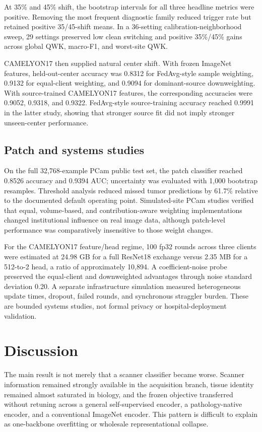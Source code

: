 \documentclass[10pt]{article}
\begin{document}
At 35\% and 45\% shift, the bootstrap intervals for all three headline metrics were positive. Removing the most frequent diagnostic family reduced trigger rate but retained positive 35/45-shift means. In a 36-setting calibration-neighborhood sweep, 29 settings preserved low clean switching and positive 35\%/45\% gains across global QWK, macro-F1, and worst-site QWK.

CAMELYON17 then supplied natural center shift. With frozen ImageNet features, held-out-center accuracy was 0.8312 for FedAvg-style sample weighting, 0.9132 for equal-client weighting, and 0.9094 for dominant-source downweighting. With source-trained CAMELYON17 features, the corresponding accuracies were 0.9052, 0.9318, and 0.9322. FedAvg-style source-training accuracy reached 0.9991 in the latter study, showing that stronger source fit did not imply stronger unseen-center performance.

\subsection{Patch and systems studies}
On the full 32,768-example PCam public test set, the patch classifier reached 0.8526 accuracy and 0.9394 AUC; uncertainty was evaluated with 1,000 bootstrap resamples. Threshold analysis reduced missed tumor predictions by 61.7\% relative to the documented default operating point. Simulated-site PCam studies verified that equal, volume-based, and contribution-aware weighting implementations changed institutional influence on real image data, although patch-level performance was comparatively insensitive to those weight changes.

For the CAMELYON17 feature/head regime, 100 fp32 rounds across three clients were estimated at 24.98 GB for a full ResNet18 exchange versus 2.35 MB for a 512-to-2 head, a ratio of approximately 10,894. A coefficient-noise probe preserved the equal-client and downweighted advantages through noise standard deviation 0.20. A separate infrastructure simulation measured heterogeneous update times, dropout, failed rounds, and synchronous straggler burden. These are bounded systems studies, not formal privacy or hospital-deployment validation.

\section{Discussion}
The main result is not merely that a scanner classifier became worse. Scanner information remained strongly available in the acquisition branch, tissue identity remained almost saturated in biology, and the frozen objective transferred without retuning across a general self-supervised encoder, a pathology-native encoder, and a conventional ImageNet encoder. This pattern is difficult to explain as one-backbone overfitting or wholesale representational collapse.
\end{document}
